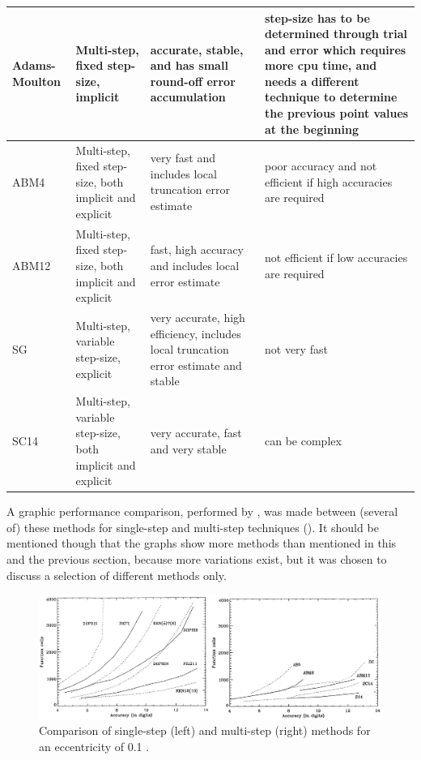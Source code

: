 \begin{longtable}{|p{1.1cm}|p{3cm}|p{5cm}|p{5cm}|}
Adams-Moulton	& Multi-step, fixed step-size, implicit & accurate, stable, and has small round-off error accumulation  & step-size has to be determined through trial and error which requires more cpu time, and needs a different technique to determine the previous point values at the beginning \\ \hline
\ac{ABM4}	& Multi-step, fixed step-size, both implicit and explicit & very fast and includes local truncation error estimate  & poor accuracy and not efficient if high accuracies are required \\ \hline
\ac{ABM12}	& Multi-step, fixed step-size, both implicit and explicit & fast, high accuracy and includes local error estimate & not efficient if low accuracies are required \\ \hline
\ac{SG}	& Multi-step, variable step-size, explicit & very accurate, high efficiency, includes local truncation error estimate and stable \cite{montenbruck1992} & not very fast  \\ \hline
\ac{SC14}	& Multi-step, variable step-size, both implicit and explicit & very accurate, fast and very stable \cite{montenbruck1992}& can be complex \\ \hline

			
\end{longtable}


A graphic performance comparison, performed by \cite{montenbruck1992}, was made between (several of) these methods for single-step and multi-step techniques (). It should be mentioned though that the graphs show more methods than mentioned in this and the previous section, because more variations exist, but it was chosen to discuss a selection of different methods only.

\begin{figure}[!ht]
\centering
\includegraphics[width=1.0\textwidth]{figures/integrators/comp_single_multi_montenbruck1992.jpg}
\caption{Comparison of single-step (left) and multi-step (right) methods for an eccentricity of 0.1 \cite{montenbruck1992}.}
\label{fig:comp_single_multi_montenbruck1992}
\end{figure}
%





